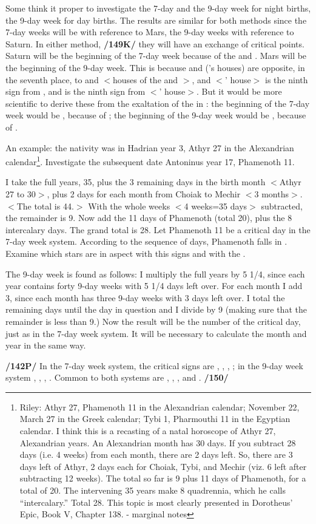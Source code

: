 Some think it proper to investigate the 7-day and the 9-day week for night births, the 9-day week for day births. The results are similar for both methods since the 7-day weeks will be with reference to Mars, the 9-day weeks with reference to Saturn. In either method, \textbf{/149K/} they will have an exchange of critical points. Saturn will be the beginning of the 7-day week because of the \Sun\xspace and \Moon. Mars will be the beginning of the 9-day week. This is because \Capricorn\xspace and \Aquarius\xspace (\Saturn’s houses) are opposite, in the seventh place, to \Cancer\xspace and \Leo\xspace $<$houses of the \Sun\xspace and \Moon$>$, and \Aries\xspace $<$\Mars’ house$>$ is the ninth
sign from \Leo, and \Cancer\xspace is the ninth sign from \Scorpio\xspace $<$\Mars’ house$>$. But it would be more scientific to derive these from the exaltation of the \Moon\xspace in \Taurus: the beginning of the 7-day week would be \Mars, because of \Scorpio; the beginning of the 9-day week would be \Saturn, because of \Capricorn.

An example: the nativity was in Hadrian year 3, Athyr 27 in the Alexandrian calendar\footnote{Riley: Athyr 27, Phamenoth 11 in the Alexandrian calendar; November 22, March 27 in the Greek calendar; Tybi 1, Pharmouthi 11 in the Egyptian calendar.
I think this is a recasting of a natal horoscope of Athyr 27, Alexandrian years. An Alexandrian month has 30 days. If you subtract 28 days (i.e. 4 weeks) from each month, there are 2
days left. So, there are 3 days left of Athyr, 2 days each for Choiak, Tybi, and Mechir (viz. 6 left after subtracting 12 weeks). The total so far is 9 plus 11 days of Phamenoth, for a total of 20. The intervening 35 years make 8 quadrennia, which he calls “intercalary.” Total 28. This topic is most clearly presented in Dorotheus’ Epic, Book V, Chapter 138. - marginal notes}. Investigate the subsequent date Antoninus year 17, Phamenoth 11. 

I take the full years, 35, plus the 3 remaining days in the birth month $<$Athyr 27 to 30$>$, plus 2 days for each month from Choiak to Mechir $<$3 months$>$. $<$The total is 44.$>$ With the whole weeks $<$4 weeks=35 days$>$ subtracted, the remainder is 9. Now add the 11 days of Phamenoth (total 20), plus the 8 intercalary days. The grand total is 28. Let Phamenoth 11 be a critical day in the 7-day week system. According to the sequence of days, Phamenoth falls in \Scorpio.
Examine which stars are in aspect with this signs and with the \Moon.

The 9-day week is found as follows: I multiply the full years by 5 1/4, since each year contains forty 9-day weeks with 5 1/4 days left over. For each month I add 3, since each month has three 9-day weeks with 3 days left over. I total the remaining days until the day in question and I divide by 9 (making sure that the remainder is less than 9.) Now the result will be the number of the critical day, just as in the 7-day week system. It will be necessary to calculate the month and year in the same way.

\textbf{/142P/} In the 7-day week system, the critical signs are \Aries, \Libra, \Cancer, \Capricorn; in the 9-day
week system \Taurus, \Leo, \Scorpio, \Aquarius. Common to both systems are \Gemini, \Sagittarius, \Virgo, and \Pisces. \textbf{/150/}

\newpage